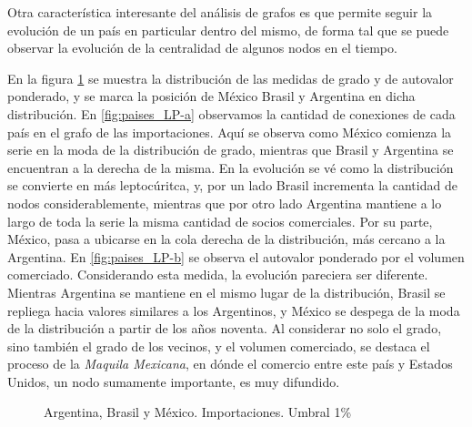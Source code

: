 \documentclass[class=article, crop=false]{standalone}
\begin{document}
Otra característica interesante del análisis de grafos es que permite seguir la evolución de un país en particular dentro del mismo, de forma tal que se puede observar la evolución de la centralidad de algunos nodos en el tiempo. \par
En la figura \ref{fig:paises_LP} se muestra la distribución de las medidas de grado y de autovalor ponderado, y se marca la posición de México Brasil y Argentina en dicha distribución. 
En \ref{fig:paises_LP-a} observamos la cantidad de conexiones de cada país en el grafo de las importaciones. Aquí se observa como México comienza la serie en la moda de la distribución de grado, mientras que Brasil y Argentina se encuentran a la derecha de la misma. En la evolución se vé como la distribución se convierte en más leptocúritca, y, por un lado Brasil incrementa la cantidad de nodos considerablemente, mientras que por otro lado Argentina mantiene a lo largo de toda la serie la misma cantidad de socios comerciales. Por su parte, México, pasa a ubicarse en la cola derecha de la distribución, más cercano a la Argentina. 
En \ref{fig:paises_LP-b} se observa el autovalor ponderado por el volumen comerciado. Considerando esta medida, la evolución pareciera ser diferente. Mientras Argentina se mantiene en el mismo lugar de la distribución, Brasil se repliega hacia valores similares a los Argentinos, y México se despega de la moda de la distribución a partir de los años noventa. Al considerar no solo el grado, sino también el grado de los vecinos, y el volumen comerciado, se destaca el proceso de la \textit{Maquila Mexicana}, en dónde el comercio entre este país y Estados Unidos, un nodo sumamente importante, es muy difundido. 

\begin{figure}[h!]
	\centering
	\caption{Argentina, Brasil y México. Importaciones. Umbral 1\%}
	\label{fig:paises_LP}
\end{figure}
\end{document}
